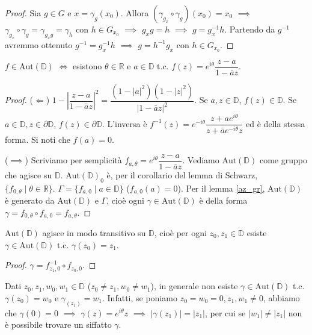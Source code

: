 \begin{proof}
  Sia $g \in G$ e $x=\gamma_g(x_0)$. Allora $(\gamma_{g_x}\circ \gamma_g)(x_0)=x_0$ $\implies$ $\gamma_{g_x}\circ \gamma_g=\gamma_{g_xg}=\gamma_h$ con $h \in G_{x_0}$ $\implies$ $g_xg=h$ $\implies$ $g=g_x^{-1}h$.
  Partendo da $g^{-1}$ avremmo ottenuto $g^{-1}=g_x^{-1}h$ $\implies$ $g=h^{-1}g_x$ con $h \in G_{x_0}$.
\end{proof}

\begin{prop}
  $f \in \text{Aut}(\mathbb{D})$ $\iff$ esistono $\theta \in \mathbb{R}$ e $a \in \mathbb{D}$ t.c. $f(z)=e^{i\theta}\dfrac{z-a}{1-\bar{a}z}$.
\end{prop}

\begin{proof}
  ($\Leftarrow$) $1-\left|\dfrac{z-a}{1-\bar{a}z}\right|^2=\dfrac{(1-|a|^2)(1-|z|^2)}{|1-\bar{a}z|^2}$. Se $a, z \in \mathbb{D}$, $f(z) \in \mathbb{D}$.
  Se $a \in \mathbb{D}, z \in \partial\mathbb{D}$, $f(z) \in \partial\mathbb{D}$. L'inversa è $f^{-1}(z)=e^{-i\theta}\dfrac{z+ae^{i\theta}}{z+\bar{a}e^{-i\theta}z}$ ed è della stessa forma. Si noti che $f(a)=0$.

  ($\implies$) Scriviamo per semplicità $f_{a, \theta}=e^{i\theta}\dfrac{z-a}{1-\bar{a}z}$. Vediamo $\text{Aut}(\mathbb{D})$ come gruppo che agisce su $\mathbb{D}$. $\text{Aut}(\mathbb{D})_0$ è, per il corollario del lemma di Schwarz, $\{f_{0, \theta} \mid \theta \in \mathbb{R}\}$.
  $\Gamma=\{f_{a, 0} \mid a \in \mathbb{D}\}$ ($f_{a, 0}(a)=0$).
  Per il lemma \ref{az_gr}, $\text{Aut}(\mathbb{D})$ è generato da $\text{Aut}(\mathbb{D})$ e $\Gamma$, cioè ogni $\gamma \in \text{Aut}(\mathbb{D})$ è della forma $\gamma=f_{0, \theta} \circ f_{a, 0}=f_{a, \theta}$.
\end{proof}

\begin{cor}
  $\text{Aut}(\mathbb{D})$ agisce in modo transitivo su $\mathbb{D}$, cioè per ogni $z_0, z_1 \in \mathbb{D}$ esiste $\gamma \in \text{Aut}(\mathbb{D})$ t.c. $\gamma(z_0)=z_1$.
\end{cor}

\begin{proof}
  $\gamma=f_{z_1, 0}^{-1} \circ f_{z_0, 0}$.
\end{proof}

\begin{oss}
  Dati $z_0, z_1, w_0, w_1 \in \mathbb{D}$ ($z_0 \not=z_1, w_0 \not=w_1$), in generale non esiste $\gamma \in \text{Aut}(\mathbb{D})$ t.c. $\gamma(z_0)=w_0$ e $\gamma_(z_1)=w_1$.
  Infatti, se poniamo $z_0=w_0=0, z_1, w_1 \not=0$, abbiamo che $\gamma(0)=0$ $\implies$ $\gamma(z)=e^{i\theta}z$ $\implies$ $|\gamma(z_1)|=|z_1|$, per cui se $|w_1|\not=|z_1|$ non è possibile trovare un siffatto $\gamma$.
\end{oss}


